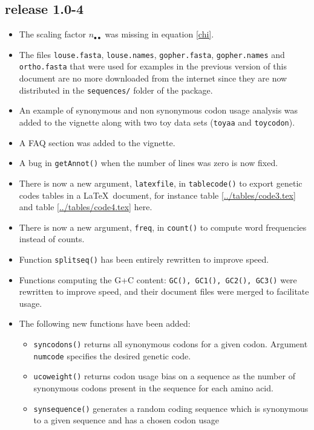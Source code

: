\documentclass{article}
\begin{document}
\subsection*{release 1.0-4}

\begin{itemize}
\item The scaling factor $n_{\bullet\bullet}$ was missing in equation \ref{chi}.
\item The files \texttt{louse.fasta}, \texttt{louse.names}, \texttt{gopher.fasta}, \texttt{gopher.names}
and \texttt{ortho.fasta} that were used for examples in the previous version of this document are
no more downloaded from the internet since they are now distributed in the \texttt{sequences/} folder
of the package.
\item An example of synonymous and non synonymous codon usage analysis was added to the
vignette along with two toy data sets (\texttt{toyaa} and \texttt{toycodon}).
\item A FAQ section was added to the vignette.
\item A bug in \texttt{getAnnot()} when the number of lines was zero is now fixed.
\item There is now a new argument, \texttt{latexfile}, in \texttt{tablecode()} to export genetic codes
tables in a \LaTeX~document, for instance table \ref{../tables/code3.tex} and table \ref{../tables/code4.tex} here.
\item There is now a new argument, \texttt{freq}, in \texttt{count()}
  to compute word frequencies instead of counts.
\item Function \texttt{splitseq()} has been entirely rewritten to improve speed.
\item Functions computing the G+C content: \texttt{GC(), GC1(), GC2(),
  GC3()} were rewritten to improve speed, and their document files
  were merged to facilitate usage.
\item The following new functions have been added:
\begin{itemize}
\item \texttt{syncodons()} returns all synonymous codons for a given
  codon. Argument \texttt{numcode} specifies the desired genetic code.
\item \texttt{ucoweight()} returns codon usage bias on a sequence as
  the number of synonymous codons present in the sequence for each
  amino acid.
\item \texttt{synsequence()} generates a random coding sequence which
      is synonymous to a given sequence and has a chosen codon usage

\end{itemize}
\end{itemize}
\end{document}
